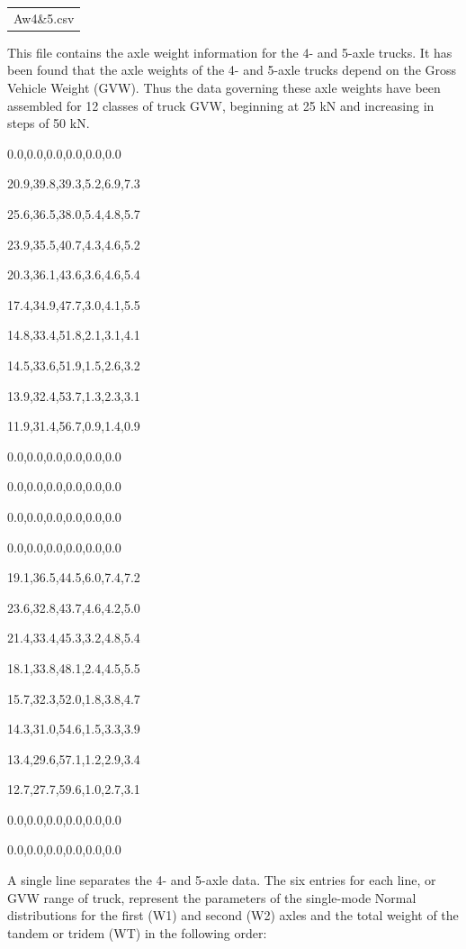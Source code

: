 \documentclass[
]{article}
\begin{document}
\begin{longtable}[]{@{}
  >{\centering\arraybackslash}p{}@{}}
\toprule\noalign{}
\endhead
\bottomrule\noalign{}
\endlastfoot
Aw4\&5.csv \\
\end{longtable}

This file contains the axle weight information for the 4- and 5-axle
trucks. It has been found that the axle weights of the 4- and 5-axle
trucks depend on the Gross Vehicle Weight (GVW). Thus the data governing
these axle weights have been assembled for 12 classes of truck GVW,
beginning at 25 kN and increasing in steps of 50 kN.

0.0,0.0,0.0,0.0,0.0,0.0

20.9,39.8,39.3,5.2,6.9,7.3

25.6,36.5,38.0,5.4,4.8,5.7

23.9,35.5,40.7,4.3,4.6,5.2

20.3,36.1,43.6,3.6,4.6,5.4

17.4,34.9,47.7,3.0,4.1,5.5

14.8,33.4,51.8,2.1,3.1,4.1

14.5,33.6,51.9,1.5,2.6,3.2

13.9,32.4,53.7,1.3,2.3,3.1

11.9,31.4,56.7,0.9,1.4,0.9

0.0,0.0,0.0,0.0,0.0,0.0

0.0,0.0,0.0,0.0,0.0,0.0

0.0,0.0,0.0,0.0,0.0,0.0

0.0,0.0,0.0,0.0,0.0,0.0

19.1,36.5,44.5,6.0,7.4,7.2

23.6,32.8,43.7,4.6,4.2,5.0

21.4,33.4,45.3,3.2,4.8,5.4

18.1,33.8,48.1,2.4,4.5,5.5

15.7,32.3,52.0,1.8,3.8,4.7

14.3,31.0,54.6,1.5,3.3,3.9

13.4,29.6,57.1,1.2,2.9,3.4

12.7,27.7,59.6,1.0,2.7,3.1

0.0,0.0,0.0,0.0,0.0,0.0

0.0,0.0,0.0,0.0,0.0,0.0

A single line separates the 4- and 5-axle data. The six entries for each
line, or GVW range of truck, represent the parameters of the single-mode
Normal distributions for the first (W1) and second (W2) axles and the
total weight of the tandem or tridem (WT) in the following order:
\end{document}
